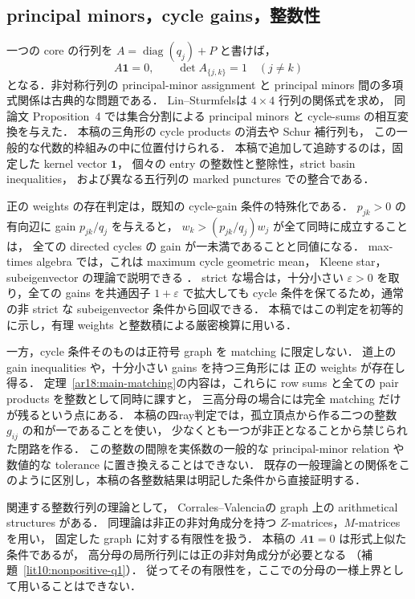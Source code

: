 \subsection{principal minors，cycle gains，整数性}

一つの core の行列を $A=\operatorname{diag}(q_j)+P$ と書けば，
\[
 A\mathbf1=0,\qquad \det A_{\{j,k\}}=1\quad(j\ne k)
\]
となる．非対称行列の principal-minor assignment と
principal minors 間の多項式関係は古典的な問題である．
Lin--Sturmfels\cite{LinSturmfels}は $4\times4$ 行列の関係式を求め，
同論文 Proposition~4 では集合分割による principal minors と cycle-sums の相互変換を与えた．
本稿の三角形の cycle products の消去や Schur 補行列も，
この一般的な代数的枠組みの中に位置付けられる．
本稿で追加して追跡するのは，固定した kernel vector $\mathbf1$，
個々の entry の整数性と整除性，strict basin inequalities，
および異なる五行列の marked punctures での整合である．

正の weights の存在判定は，既知の cycle-gain 条件の特殊化である．
$p_{jk}>0$ の有向辺に gain $p_{jk}/q_j$ を与えると，
$w_k>(p_{jk}/q_j)w_j$ が全て同時に成立することは，
全ての directed cycles の gain が一未満であることと同値になる．
max-times algebra では，これは maximum cycle geometric mean，
Kleene star，subeigenvector の理論で説明できる
\cite[\S2, Theorem~2.2 and Proposition~2.5]{SergeevSchneiderButkovic}．
strict な場合は，十分小さい $\varepsilon>0$ を取り，全ての gains を共通因子 $1+\varepsilon$ で拡大しても
cycle 条件を保てるため，通常の非 strict な subeigenvector 条件から回収できる．
本稿ではこの判定を初等的に示し，有理 weights と整数積による厳密検算に用いる．

一方，cycle 条件そのものは正符号 graph を matching に限定しない．
道上の gain inequalities や，十分小さい gains を持つ三角形には
正の weights が存在し得る．
定理~\ref{ar18:main-matching}の内容は，これらに
row sums と全ての pair products を整数として同時に課すと，
三高分母の場合には完全 matching だけが残るという点にある．
本稿の四ray判定では，孤立頂点から作る二つの整数 $g_{ij}$ の和が一であることを使い，
少なくとも一つが非正となることから禁じられた閉路を作る．
この整数の間隙を実係数の一般的な principal-minor relation や
数値的な tolerance に置き換えることはできない．
既存の一般理論との関係をこのように区別し，本稿の各整数結果は明記した条件から直接証明する．

関連する整数行列の理論として，
Corrales--Valencia\cite[\S\S2--3]{CorralesValencia}の graph 上の arithmetical structures がある．
同理論は非正の非対角成分を持つ $Z$-matrices，$M$-matrices を用い，
固定した graph に対する有限性を扱う．
本稿の $A\mathbf1=0$ は形式上似た条件であるが，
高分母の局所行列には正の非対角成分が必要となる
（補題~\ref{lit10:nonpositive-q1}）．
従ってその有限性を，ここでの分母の一様上界として用いることはできない．

